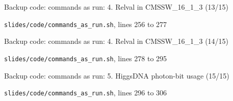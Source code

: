 \begin{frame}{Backup code: commands as run: 4. Relval in CMSSW\_16\_1\_3 (13/15)}
  \vspace{0pt}\par
  {\tiny\color{lightgrey}\texttt{slides/code/commands\_as\_run.sh}, lines 256 to 277\par}
  
\end{frame}
\begin{frame}{Backup code: commands as run: 4. Relval in CMSSW\_16\_1\_3 (14/15)}
  \vspace{0pt}\par
  {\tiny\color{lightgrey}\texttt{slides/code/commands\_as\_run.sh}, lines 278 to 295\par}
  
\end{frame}
\begin{frame}{Backup code: commands as run: 5. HiggsDNA photon-bit usage (15/15)}
  \vspace{0pt}\par
  {\tiny\color{lightgrey}\texttt{slides/code/commands\_as\_run.sh}, lines 296 to 306\par}
  
\end{frame}
